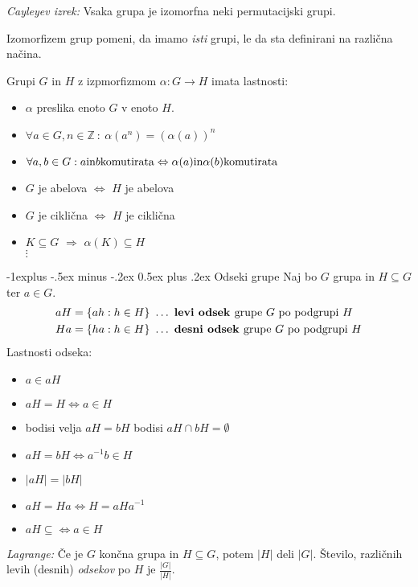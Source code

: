 \documentclass[a4paper,9pt]{extarticle}
\makeatletter
\renewcommand{\subsection}{\@startsection{subsection}{2}{0mm}%
                                {-1explus -.5ex minus -.2ex}%
                                {0.5ex plus .2ex}%
                                {\normalfont\normalsize\bfseries}}
\makeatother
\begin{document}
\begin{multicols}{3}
\emph{Cayleyev izrek:} Vsaka grupa je izomorfna neki permutacijski grupi.

Izomorfizem grup pomeni, da imamo \emph{isti} grupi, le da sta definirani na različna načina.

Grupi $G$ in $H$ z izpmorfizmom $\alpha: G \to H$ imata lastnosti:
\begin{itemize}
    \item $\alpha$ preslika enoto $G$ v enoto $H$.
    \item $\forall a \in G, n \in \mathbb{Z}\ :\ \alpha(a^n) = \left( \alpha(a) \right)^n$
    \item $\forall a,b \in G : a \textmd{in} b \textmd{komutirata} \Leftrightarrow \alpha(a) \textmd{in} \alpha(b) \textmd{komutirata}$
    \item $G$ je abelova $\Leftrightarrow$ $H$ je abelova
    \item $G$ je ciklična $\Leftrightarrow$ $H$ je ciklična
    \item $K \subseteq G$ $\Rightarrow$ $\alpha(K) \subseteq H$\\
    $\vdots$
\end{itemize}


\subsection{Odseki grupe}
Naj bo $G$ grupa in $H \subseteq G$ ter $a \in G$.
\begin{equation*}
    \begin{aligned}
        aH = \left\{ ah : h \in H \right\}\ &\dots\ \textbf{levi odsek }\textmd{grupe $G$ po podgrupi $H$}\\
        Ha = \left\{ ha : h \in H \right\}\ &\dots\ \textbf{desni odsek }\textmd{grupe $G$ po podgrupi $H$}\\
    \end{aligned}
\end{equation*}
Lastnosti odseka:
\begin{itemize}
    \item $a \in aH$
    \item $aH = H \Leftrightarrow a \in H$
    \item bodisi velja $aH = bH$ bodisi $aH \cap bH = \emptyset$
    \item $aH = bH \Leftrightarrow a^{-1}b \in H$
    \item $|aH| = |bH|$
    \item $aH = Ha \Leftrightarrow H = aHa^{-1}$
    \item $aH \subseteq \Leftrightarrow a \in H$
\end{itemize}
\emph{Lagrange:} Če je $G$ končna grupa in $H \subseteq G$, potem $|H|$ deli $|G|$.
Število, različnih levih (desnih) \emph{odsekov} po $H$ je $\frac{|G|}{|H|}$.


\end{multicols}
\end{document}
